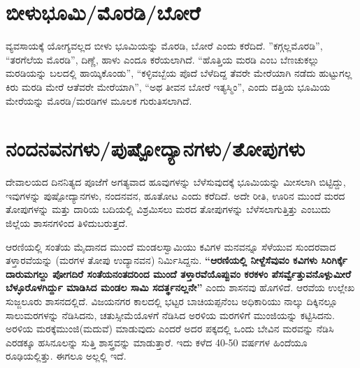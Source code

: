 \newpage

\section{ಬೀಳುಭೂಮಿ/ಮೊರಡಿ/ಬೋರೆ}

ವ್ಯವಸಾಯಕ್ಕೆ ಯೋಗ್ಯವಲ್ಲದ ಬೀಳು ಭೂಮಿಯನ್ನು ಮೊರಡಿ, ಬೋರೆ ಎಂದು ಕರೆದಿದೆ. ”ಕಗ್ಗಲ್ಲಮೊರಡಿ”, “ತರಗೆಲೆಯ ಮೊರಡಿ”, ದಿಣ್ಣೆ, ಹಾಳು ಎಂದೂ ಕರೆಯಲಾಗಿದೆ. “ಹೊತ್ತಿಯ ಮರಡಿ ಎಂಬ ಬೆಣಚುಕಲ್ಲು ಮರಡಿಯನ್ನು ಬಲದಲ್ಲಿ ಹಾಯ್ಕಿಕೊಂಡು”, “ಕಳ್ಳಿವಬ್ಬೆಯ ಪೊದೆ ಬೆಳೆದಿದ್ದ ತೆವರೇ ಮೇರೆಯಾಗಿ ನಡೆದು ಹುಟ್ಟುಗಲ್ಲ ಕಿರು ಮರಡಿ ಮೇರೆ ಆ\break ತೆವರೇ ಮೇರೆಯಾಗಿ”, “ಅಥ ತೀವನ ಬೋರೆ ಇತ್ಯಸ್ಮಿಂ”, ಎಂದು ದತ್ತಿಯ ಭೂಮಿಯ ಮೇರೆಯನ್ನು ಮೊರಡಿ/ಮರಡಿಗಳ ಮೂಲಕ ಗುರುತಿಸಲಾಗಿದೆ.


\section{ನಂದನವನಗಳು/ಪುಷ್ಪೋದ್ಯಾನಗಳು/ತೋಪುಗಳು}

ದೇವಾಲಯದ ದಿನನಿತ್ಯದ ಪೂಜೆಗೆ ಅಗತ್ಯವಾದ ಹೂವುಗಳನ್ನು ಬೆಳೆಸುವುದಕ್ಕೆ ಭೂಮಿಯನ್ನು ಮೀಸಲಾಗಿ ಬಿಟ್ಟಿದ್ದು, ಇವುಗಳನ್ನು ಪುಷ್ಪೋದ್ಯಾನಗಳು, ನಂದನವನ, ಹೂತೋಟ ಎಂದು ಕರೆದಿದೆ. ಅದೇ ರೀತಿ, ಊರಿನ ಮುಂದೆ ಮರದ ತೋಪು\-ಗಳನ್ನು ಮತ್ತು ದಾರಿಯ ಬದಿಯಲ್ಲಿ ವಿಶ್ರಮಿಸಲು ಮರದ ತೋಪುಗಳನ್ನು ಬೆಳೆಸಲಾಗುತ್ತಿತ್ತು ಎಂಬುದು ಜಿಲ್ಲೆಯ ಶಾಸನಗಳಿಂದ ತಿಳಿದುಬರುತ್ತದೆ.

ಆರಣಿಯಲ್ಲಿ ಸಂತೆಯ ಮೈದಾನದ ಮುಂದೆ ಮಂಡಲಸ್ವಾಮಿಯು ಕವಿಗಳ ಮನವನ್ನೂ ಸೆಳೆಯುವ ಸುಂದರವಾದ ತಳ್ತಾರವೆಯನ್ನು (ಮರಗಳ ತೋಪು ಉದ್ಯಾನವನ) ನಿರ್ಮಿಸಿದ್ದನು. \textbf{“ಆರಣಿಯಲ್ಲಿ ನೀಳ್ದೆಸೆವುವಂ ಕವಿಗಳು ಸಿರಿಗಿರ್ಕ್ಕೆ ದಾರುಮಗಲ್ದು ಪೋಗದಿರೆ ಸಂತೆಯನಂತದರಿಂದ ಮುಂದೆ ತಳ್ತಾರವೆಯೊಪ್ಪುವಂ ಕರಕಳಂ ಪೆಸರ್ವ್ವೆತ್ತುವನೊಳ್ಪುಮೀರೆ ಬೆಳ್ಳೂರೊಳ\-ಗಿರ್ದ್ದು ಮಾಡಿಸಿದ ಮಂಡಲ ಸಾಮಿ ಸದರ್ತ್ಥನಲ್ಲನೇ”} ಎಂದು ಶಾಸನವು ಹೊಗಳಿದೆ. ಆರವೆಯ ಉಲ್ಲೇಖ ಸುಜ್ಜಲೂರು ಶಾಸನದಲ್ಲಿದೆ. ವಿಜಯನಗರ ಕಾಲದಲ್ಲಿ ಭಟ್ಟರ ಬಾಚಿಯಪ್ಪನೆಂಬ ಅಧಿಕಾರಿಯು ನಾಲ್ಕು ದಿಕ್ಕಿನಲ್ಲೂ ಸಾಲುಮರಗಳನ್ನು ನೆಡಿಸಿದನು, ಚತುಸ್ಸೀಮೆಯೊಳಗೆ ನೆಡಿಸಿದ ಅರಳಿಯ ಮರಗಳಿಗೆ ಮುಂಜಿಯನ್ನು ಕಟ್ಟಿಸಿದನು. ಅರಳಿಯ ಮರಕ್ಕೆ\break ಮುಂಜಿ(ಮದುವೆ) ಮಾಡುವುದು ಎಂದರೆ ಅದರ ಪಕ್ಕದಲ್ಲಿ ಒಂದು ಬೇವಿನ ಮರವನ್ನು ನೆಡಿಸಿ ಎರಡಕ್ಕೂ ಹಸಿನೂಲನ್ನು ಸುತ್ತಿ ಶಾಸ್ತ್ರವನ್ನು ಮಾಡುತ್ತಾರೆ. ಇದು ಕಳೆದ 40-50 ವರ್ಷಗಳ ಹಿಂದೆಯೂ ರೂಢಿಯಲ್ಲಿತ್ತು. ಈಗಲೂ ಅಲ್ಲಲ್ಲಿ ಇದೆ.

